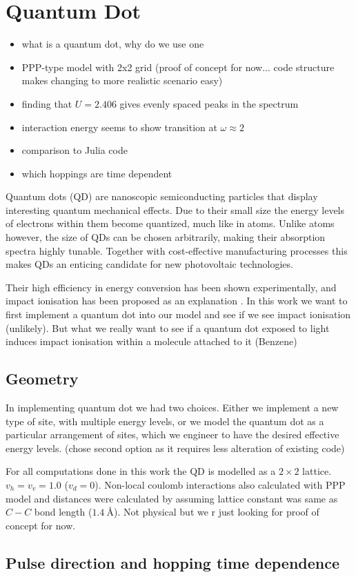 \section{Quantum Dot}
\begin{itemize}
    \item what is a quantum dot, why do we use one
    \item PPP-type model with 2x2 grid (proof of concept for now... code structure makes changing to more realistic scenario easy)
    \item finding that $U=2.406$ gives evenly spaced peaks in the spectrum
    \item interaction energy seems to show transition at $\omega\approx 2$
    \item comparison to Julia code
    \item which hoppings are time dependent
\end{itemize}

Quantum dots (QD) are nanoscopic semiconducting particles that display interesting quantum mechanical effects. Due to their small size the energy levels of electrons within them become quantized, much like in atoms. Unlike atoms however, the size of QDs can be chosen arbitrarily, making their absorption spectra highly tunable.  Together with cost-effective manufacturing processes this makes QDs an enticing candidate for new photovoltaic technologies.
\medskip

Their high efficiency in energy conversion has been shown experimentally, and impact ionisation has been proposed as an explanation \cite{impact_io_in_qd}. In this work we want to first implement a quantum dot into our model and see if we see impact ionisation (unlikely). But what we really want to see if a quantum dot exposed to light induces impact ionisation within a molecule attached to it (Benzene)

\subsection{Geometry}
 
 In implementing quantum dot we had two choices. Either we implement a new type of site, with multiple energy levels, or we model the quantum dot as a particular arrangement of sites, which we engineer to have the desired effective energy levels. (chose second option as it requires less alteration of existing code)
 
 \medskip
 
 For all computations done in this work the QD is modelled as a $2\times 2$ lattice. $v_h = v_v = 1.0$ ($v_d = 0$). Non-local coulomb interactions also calculated with PPP model and distances were calculated by assuming lattice constant was same as $C-C$ bond length ($\SI{1.4}{\angstrom}$). Not physical but we r just looking for proof of concept for now.
 
 \subsection{Pulse direction and hopping time dependence}